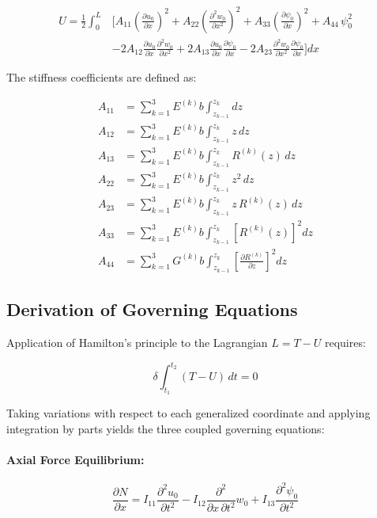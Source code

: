 \documentclass[12pt,a4paper]{report}
\begin{document}
\begin{align}
U = \frac{1}{2} \int_0^L &\Bigg[ 
A_{11} \left(\frac{\partial u_0}{\partial x}\right)^2 
+ A_{22} \left(\frac{\partial^2 w_0}{\partial x^2}\right)^2 
+ A_{33} \left(\frac{\partial \psi_0}{\partial x}\right)^2 
+ A_{44} \, \psi_0^2 \nonumber \\[6pt]
&- 2A_{12} \frac{\partial u_0}{\partial x} \frac{\partial^2 w_0}{\partial x^2} 
+ 2A_{13} \frac{\partial u_0}{\partial x} \frac{\partial \psi_0}{\partial x} 
- 2A_{23} \frac{\partial^2 w_0}{\partial x^2} \frac{\partial \psi_0}{\partial x}
\Bigg] dx
\end{align}

The stiffness coefficients are defined as:

\begin{align}
A_{11} &= \sum_{k=1}^{3} E^{(k)} b \int_{z_{k-1}}^{z_k} dz \\[6pt]
A_{12} &= \sum_{k=1}^{3} E^{(k)} b \int_{z_{k-1}}^{z_k} z \, dz \\[6pt]
A_{13} &= \sum_{k=1}^{3} E^{(k)} b \int_{z_{k-1}}^{z_k} R^{(k)}(z) \, dz \\[6pt]
A_{22} &= \sum_{k=1}^{3} E^{(k)} b \int_{z_{k-1}}^{z_k} z^2 \, dz \\[6pt]
A_{23} &= \sum_{k=1}^{3} E^{(k)} b \int_{z_{k-1}}^{z_k} z \, R^{(k)}(z) \, dz \\[6pt]
A_{33} &= \sum_{k=1}^{3} E^{(k)} b \int_{z_{k-1}}^{z_k} \left[R^{(k)}(z)\right]^2 dz \\[6pt]
A_{44} &= \sum_{k=1}^{3} G^{(k)} b \int_{z_{k-1}}^{z_k} \left[ \frac{\partial R^{(k)}}{\partial z} \right]^2 dz
\end{align}


\subsection*{Derivation of Governing Equations}

Application of Hamilton's principle to the Lagrangian $L = T - U$ requires:

\begin{equation}
\delta \int_{t_1}^{t_2} (T - U) \, dt = 0
\end{equation}

Taking variations with respect to each generalized coordinate and applying integration by parts yields the three coupled governing equations:

\paragraph{Axial Force Equilibrium:}
\begin{equation}
\frac{\partial N}{\partial x} 
= I_{11} \frac{\partial^2 u_0}{\partial t^2} 
- I_{12} \frac{\partial^2}{\partial x \, \partial t^2} w_0 
+ I_{13} \frac{\partial^2 \psi_0}{\partial t^2}
\end{equation}
\end{document}

